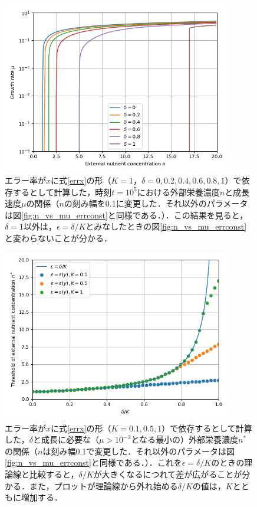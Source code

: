 \begin{figure}[htbp]
  \centering
  \includegraphics[width=10cm]{n_vs_mu_K1s0_errslope_all.png}
  \caption{エラー率が$x$に式\eqref{errx}の形（$K=1$，$\delta=0,0.2,0.4,0.6,0.8,1$）で依存するとして計算した，時刻$t=10^5$における外部栄養濃度$n$と成長速度$\mu$の関係（$n$の刻み幅を0.1に変更した．それ以外のパラメータは図\ref{fig:n_vs_mu_errconst}と同様である．）．この結果を見ると，$\delta=1$以外は，$\epsilon=\delta/K$とみなしたときの図\ref{fig:n_vs_mu_errconst}と変わらないことが分かる．}
  \label{fig:n_vs_mu_K1s0}
\end{figure}

\begin{figure}[htbp]
  \centering
  \includegraphics[width=10cm]{err_vs_n_errslope_s0_K.png}
  \caption{エラー率が$x$に式\eqref{errx}の形（$K=0.1,0.5,1$）で依存するとして計算した，$\delta$と成長に必要な（$\mu > 10^{-3}$となる最小の）外部栄養濃度$n^*$の関係（$n$は刻み幅0.1で変更した．それ以外のパラメータは図\ref{fig:n_vs_mu_errconst}と同様である．）．これを$\epsilon=\delta/K$のときの理論線と比較すると，$\delta/K$が大きくなるにつれて差が広がることが分かる．また，プロットが理論線から外れ始める$\delta/K$の値は，$K$とともに増加する．}
  \label{fig:err_vs_n_errslope_s0}
\end{figure}